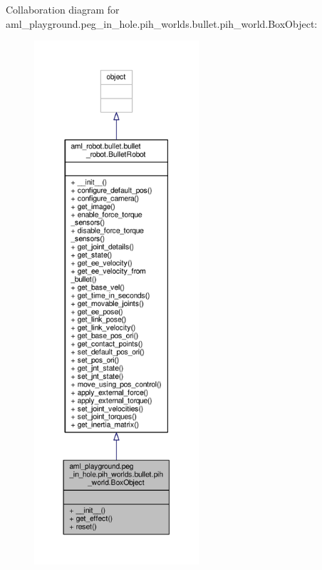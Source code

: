 Collaboration diagram for aml\-\_\-playground.\-peg\-\_\-in\-\_\-hole.\-pih\-\_\-worlds.\-bullet.\-pih\-\_\-world.\-Box\-Object\-:\nopagebreak
\begin{figure}[H]
\begin{center}
\leavevmode
\includegraphics[height=550pt]{classaml__playground_1_1peg__in__hole_1_1pih__worlds_1_1bullet_1_1pih__world_1_1_box_object__coll__graph}
\end{center}
\end{figure}
